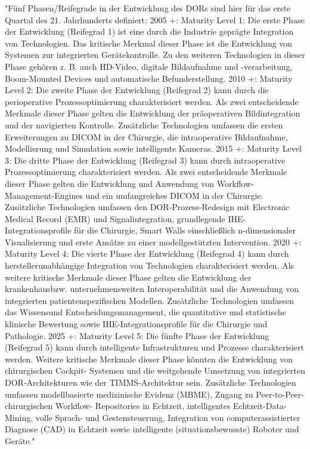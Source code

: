 	"Fünf Phasen/Reifegrade in der Entwicklung des DORs sind hier für das erste Quartal
	des 21. Jahrhunderts definiert:
		2005 +: Maturity Level 1: Die erste Phase der Entwicklung (Reifegrad 1) ist eine
	durch die Industrie geprägte Integration von Technologien. Das kritische Merkmal
	dieser Phase ist die Entwicklung von Systemen zur integrierten Gerätekontrolle. Zu
	den weiteren Technologien in dieser Phase gehören z. B. auch HD-Video, digitale Bildaufnahme
	und -verarbeitung, Boom-Mounted Devices und automatische Befunderstellung.
		2010 +: Maturity Level 2: Die zweite Phase der Entwicklung (Reifegrad 2) kann
	durch die perioperative Prozessoptimierung charakterisiert werden. Als zwei entscheidende
	Merkmale dieser Phase gelten die Entwicklung der präoperativen Bildintegration
	und der navigierten Kontrolle. Zusätzliche Technologien umfassen die
	ersten Erweiterungen zu DICOM in der Chirurgie, die intraoperative Bildaufnahme,
	Modellierung und Simulation sowie intelligente Kameras.
		2015 +: Maturity Level 3: Die dritte Phase der Entwicklung (Reifegrad 3) kann
	durch intraoperative Prozessoptimierung charakterisiert werden. Als zwei entscheidende
	Merkmale dieser Phase gelten die Entwicklung und Anwendung von Workflow-
	Management-Engines und ein umfangreiches DICOM in der Chirurgie. Zusätzliche
	Technologien umfassen den DOR-Prozess-Redesign mit Electronic Medical Record
	(EMR) und Signalintegration, grundlegende IHE-Integrationsprofile für die Chirurgie,
	Smart Walls einschließlich n-dimensionaler Visualisierung und erste Ansätze zu
	einer modellgestützten Intervention.
		2020 +: Maturity Level 4: Die vierte Phase der Entwicklung (Reifegrad 4) kann
	durch herstellerunabhängige Integration von Technologien charakterisiert werden.
	Als weitere kritische Merkmale dieser Phase gelten die Entwicklung der krankenhausbzw.
	unternehmensweiten Interoperabilität und die Anwendung von integrierten
	patientenspezifischen Modellen. Zusätzliche Technologien umfassen das Wissensund
	Entscheidungsmanagement, die quantitative und statistische klinische Bewertung
	sowie IHE-Integrationsprofile für die Chirurgie und Pathologie.
		2025 +: Maturity Level 5: Die fünfte Phase der Entwicklung (Reifegrad 5) kann
	durch intelligente Infrastrukturen und Prozesse charakterisiert werden. Weitere kritische
	Merkmale dieser Phase könnten die Entwicklung von chirurgischen Cockpit-
	Systemen und die weitgehende Umsetzung von integrierten DOR-Architekturen wie
	der TIMMS-Architektur sein. Zusätzliche Technologien umfassen modellbasierte
	medizinische Evidenz (MBME), Zugang zu Peer-to-Peer-chirurgischen Workflow-
	Repositories in Echtzeit, intelligentes Echtzeit-Data-Mining, volle Sprach- und Gestensteuerung,
	Integration von computerassistierter Diagnose (CAD) in Echtzeit sowie
	intelligente (situationsbewusste) Roboter und Geräte."
	
